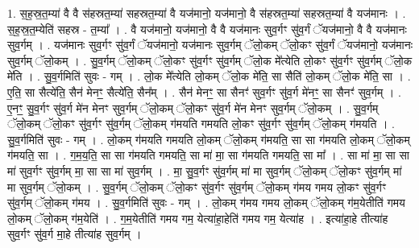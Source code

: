 \documentclass[17pt]{extarticle}
\begin{document}
1. स॒ह॒स्र॒त॒म्या॑ वै वै स॑हस्रत॒म्या॑ सहस्रत॒म्या॑ वै यज॑मानो॒ यज॑मानो॒ वै स॑हस्रत॒म्या॑ सहस्रत॒म्या॑ वै यज॑मानः । . स॒ह॒स्र॒त॒म्येति॑ सहस्र - त॒म्या᳚ । . वै यज॑मानो॒ यज॑मानो॒ वै वै यज॑मानः सुव॒र्गꣳ सु॑व॒र्गं ॅयज॑मानो॒ वै वै यज॑मानः सुव॒र्गम् । . यज॑मानः सुव॒र्गꣳ सु॑व॒र्गं ॅयज॑मानो॒ यज॑मानः सुव॒र्गम् ॅलो॒कम् ॅलो॒कꣳ सु॑व॒र्गं ॅयज॑मानो॒ यज॑मानः सुव॒र्गम् ॅलो॒कम् । . सु॒व॒र्गम् ॅलो॒कम् ॅलो॒कꣳ सु॑व॒र्गꣳ सु॑व॒र्गम् ॅलो॒क मे᳚त्येति लो॒कꣳ सु॑व॒र्गꣳ सु॑व॒र्गम् ॅलो॒क मे॑ति । . सु॒व॒र्गमिति॑ सुवः - गम् । . लो॒क मे᳚त्येति लो॒कम् ॅलो॒क मे॑ति॒ सा सैति॑ लो॒कम् ॅलो॒क मे॑ति॒ सा । . ए॒ति॒ सा सैत्ये॑ति॒ सैन॑ मेनꣳ॒॒ सैत्ये॑ति॒ सैन᳚म् । . सैन॑ मेनꣳ॒॒ सा सैनꣳ॑ सुव॒र्गꣳ सु॑व॒र्ग मे॑नꣳ॒॒ सा सैनꣳ॑ सुव॒र्गम् । . ए॒नꣳ॒॒ सु॒व॒र्गꣳ सु॑व॒र्ग मे॑न मेनꣳ सुव॒र्गम् ॅलो॒कम् ॅलो॒कꣳ सु॑व॒र्ग मे॑न मेनꣳ सुव॒र्गम् ॅलो॒कम् । . सु॒व॒र्गम् ॅलो॒कम् ॅलो॒कꣳ सु॑व॒र्गꣳ सु॑व॒र्गम् ॅलो॒कम् ग॑मयति गमयति लो॒कꣳ सु॑व॒र्गꣳ सु॑व॒र्गम् ॅलो॒कम् ग॑मयति । . सु॒व॒र्गमिति॑ सुवः - गम् । . लो॒कम् ग॑मयति गमयति लो॒कम् ॅलो॒कम् ग॑मयति॒ सा सा ग॑मयति लो॒कम् ॅलो॒कम् ग॑मयति॒ सा । . ग॒म॒य॒ति॒ सा सा ग॑मयति गमयति॒ सा मा॑ मा॒ सा ग॑मयति गमयति॒ सा मा᳚ । . सा मा॑ मा॒ सा सा मा॑ सुव॒र्गꣳ सु॑व॒र्गम् मा॒ सा सा मा॑ सुव॒र्गम् । . मा॒ सु॒व॒र्गꣳ सु॑व॒र्गम् मा॑ मा सुव॒र्गम् ॅलो॒कम् ॅलो॒कꣳ सु॑व॒र्गम् मा॑ मा सुव॒र्गम् ॅलो॒कम् । . सु॒व॒र्गम् ॅलो॒कम् ॅलो॒कꣳ सु॑व॒र्गꣳ सु॑व॒र्गम् ॅलो॒कम् ग॑मय गमय लो॒कꣳ सु॑व॒र्गꣳ सु॑व॒र्गम् ॅलो॒कम् ग॑मय । . सु॒व॒र्गमिति॑ सुवः - गम् । . लो॒कम् ग॑मय गमय लो॒कम् ॅलो॒कम् ग॑म॒येतीति॑ गमय लो॒कम् ॅलो॒कम् ग॑म॒येति॑ । . ग॒म॒येतीति॑ गमय गम॒ येत्या॑हा॒हेति॑ गमय गम॒ येत्या॑ह । . इत्या॑हा॒हे तीत्या॑ह सुव॒र्गꣳ सु॑व॒र्ग मा॒हे तीत्या॑ह सुव॒र्गम् । \newline
\end{document}
